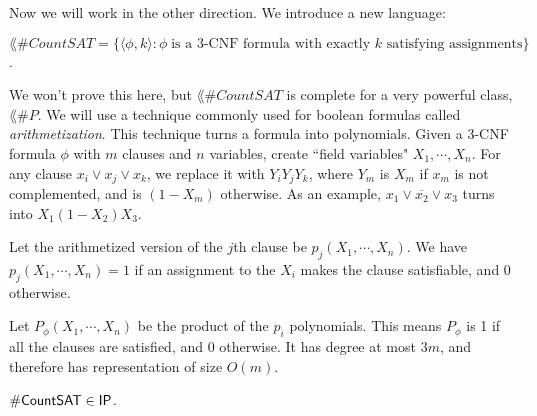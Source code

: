 Now we will work in the other direction. We introduce a new language:
\newcommand{\CountSAT}{\lang{\#CountSAT}}
\begin{definition}
$\CountSAT = \{\langle \phi, k \rangle \colon \phi\;\text{is a 3-CNF formula with exactly $k$ satisfying assignments}\}$.
\end{definition}
We won't prove this here, but $\CountSAT$ is complete for a very powerful class, $\lang{\#P}$. We will use a technique commonly used for boolean formulas called \emph{arithmetization}. This technique turns a formula into polynomials. Given a 3-CNF formula $\phi$ with $m$ clauses and $n$ variables, create ``field variables" $X_1, \cdots, X_n$. For any clause $x_i \vee x_j \vee x_k$, we replace it with $Y_iY_jY_k$, where $Y_m$ is $X_m$ if $x_m$ is not complemented, and is $(1-X_m)$ otherwise. As an example, $x_1 \vee \overline{x_2} \vee x_3$ turns into $X_1(1-X_2)X_3$. 

\par Let the arithmetized version of the $j$th clause be $p_j(X_1, \cdots, X_n)$. We have $p_j(X_1, \cdots, X_n) = 1$ if an assignment to the $X_i$ makes the clause satisfiable, and 0 otherwise. 

\par Let $P_{\phi}(X_1, \cdots, X_n)$ be the product of the $p_i$ polynomials. This means $P_{\phi}$ is 1 if all the clauses are satisfied, and 0 otherwise. It has degree at most $3m$, and therefore has representation of size $O(m)$. 

\begin{theorem}
$\CountSAT \in \IP$.
\end{theorem}

